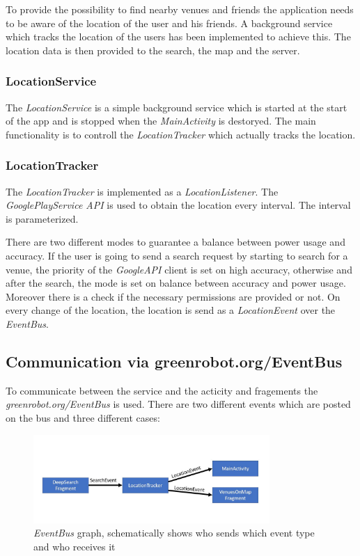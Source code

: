 To provide the possibility to find nearby venues and friends the application needs to be aware of the location of the user and his friends. A background service which tracks the location of the users has been implemented to achieve this. The location data is then provided to the search, the map and the server.

\subsubsection{LocationService}
The \textit{LocationService} is a simple background service which is started at the start of the app and is stopped when the \textit{MainActivity} is destoryed. The main functionality is to controll the \textit{LocationTracker} which actually tracks the location.

\subsubsection{LocationTracker}
The \textit{LocationTracker} is implemented as a \textit{LocationListener}. The \textit{GooglePlayService API} is used to obtain the location every interval. The interval is parameterized.

There are two different modes to guarantee a balance between power usage and accuracy. If the user is going to send a search request by starting to search for a venue, the priority of the \textit{GoogleAPI} client is set on high accuracy, otherwise and after the search, the mode is set on balance between accuracy and power usage. Moreover there is a check if the necessary permissions are provided or not. On every change of the location, the location is send as a \textit{LocationEvent} over the \textit{EventBus}. 

\subsection{Communication via greenrobot.org/EventBus}

To communicate between the service and the acticity and fragements the \textit{greenrobot.org/EventBus} is used. There are two different events which are posted on the bus and three different cases:


\begin{figure}[htbp]
	\includegraphics[width=0.8\textwidth]{images/eventBus.jpg}
	\centering
	\caption[]{\textit{EventBus} graph, schematically shows who sends which event type and who receives it}
	\label{fig:eventbus}
\end{figure} 


